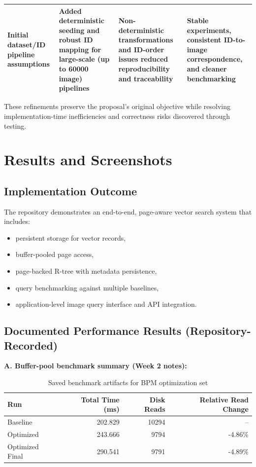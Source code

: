 \documentclass[11pt,a4paper]{article}
\begin{document}
\begin{table}[H]
\begin{tabular}{p{}p{}p{}p{}}
\midrule
Initial dataset/ID pipeline assumptions & Added deterministic seeding and robust ID mapping for large-scale (up to 60000 image) pipelines & Non-deterministic transformations and ID-order issues reduced reproducibility and traceability & Stable experiments, consistent ID-to-image correspondence, and cleaner benchmarking \\
\bottomrule
\end{tabular}
\end{table}

These refinements preserve the proposal's original objective while resolving implementation-time inefficiencies and correctness risks discovered through testing.

\section{Results and Screenshots}

\subsection{Implementation Outcome}

The repository demonstrates an end-to-end, page-aware vector search system that includes:

\begin{itemize}[leftmargin=1.5em]
  \item persistent storage for vector records,
  \item buffer-pooled page access,
  \item page-backed R-tree with metadata persistence,
  \item query benchmarking against multiple baselines,
  \item application-level image query interface and API integration.
\end{itemize}

\subsection{Documented Performance Results (Repository-Recorded)}

\textbf{A. Buffer-pool benchmark summary (Week 2 notes):}

\begin{table}[H]
\centering
\caption{Saved benchmark artifacts for BPM optimization set}
\begin{tabular}{lrrr}
\toprule
Run & Total Time (ms) & Disk Reads & Relative Read Change \\
\midrule
Baseline & 202.829 & 10294 & -- \\
Optimized & 243.666 & 9794 & -4.86\% \\
Optimized Final & 290.541 & 9791 & -4.89\% \\
\bottomrule
\end{tabular}
\end{table}
\end{document}
